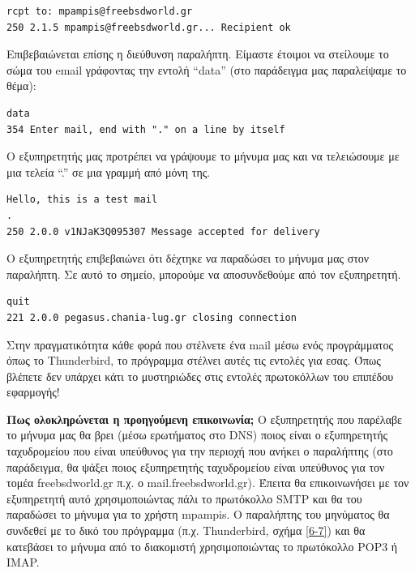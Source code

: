 \begin{inthebox}
\begin{verbatim}
rcpt to: mpampis@freebsdworld.gr
250 2.1.5 mpampis@freebsdworld.gr... Recipient ok
\end{verbatim}

Επιβεβαιώνεται επίσης η διεύθυνση παραλήπτη. Είμαστε έτοιμοι να στείλουμε το σώμα του email γράφοντας την εντολή ``data'' (στο παράδειγμα μας παραλείψαμε το θέμα):

\begin{verbatim}
data
354 Enter mail, end with "." on a line by itself
\end{verbatim}

Ο εξυπηρετητής μας προτρέπει να γράψουμε το μήνυμα μας και να τελειώσουμε με μια τελεία ``.'' σε μια γραμμή από μόνη της.

\begin{verbatim}
Hello, this is a test mail
.
250 2.0.0 v1NJaK3Q095307 Message accepted for delivery
\end{verbatim}

Ο εξυπηρετητής επιβεβαιώνει ότι δέχτηκε να παραδώσει το μήνυμα μας στον παραλήπτη. Σε αυτό το σημείο, μπορούμε να αποσυνδεθούμε από τον εξυπηρετητή.

\begin{verbatim}
quit
221 2.0.0 pegasus.chania-lug.gr closing connection
\end{verbatim}


Στην πραγματικότητα κάθε φορά που στέλνετε ένα mail μέσω ενός προγράμματος όπως το Thunderbird, το πρόγραμμα στέλνει αυτές τις εντολές για εσας. Όπως βλέπετε δεν υπάρχει κάτι το μυστηριώδες στις εντολές πρωτοκόλλων του επιπέδου εφαρμογής!\\
\end{inthebox}

\textbf{Πως ολοκληρώνεται η προηγούμενη επικοινωνία;} Ο εξυπηρετητής που παρέλαβε το μήνυμα μας θα βρει (μέσω ερωτήματος στο DNS) ποιος είναι ο εξυπηρετητής ταχυδρομείου που είναι υπεύθυνος για την περιοχή που ανήκει ο παραλήπτης (στο παράδειγμα, θα ψάξει ποιος εξυπηρετητής ταχυδρομείου είναι υπεύθυνος για τον τομέα freebsdworld.gr π.χ. ο mail.freebsdworld.gr). Έπειτα θα επικοινωνήσει με τον εξυπηρετητή αυτό χρησιμοποιώντας πάλι το πρωτόκολλο SMTP και θα του παραδώσει το μήνυμα για το χρήστη mpampis. Ο παραλήπτης του μηνύματος θα συνδεθεί με το δικό του πρόγραμμα (π.χ. Thunderbird, σχήμα \ref{6-7}) και θα κατεβάσει το μήνυμα από το διακομιστή χρησιμοποιώντας το πρωτόκολλο POP3 ή IMAP.


